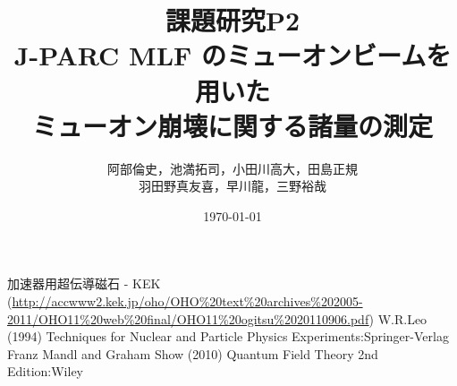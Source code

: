 \documentclass[titlepage]{jsarticle}
\begin{document}
\title{課題研究P2\\J-PARC MLF  のミューオンビームを用いた\\ミューオン崩壊に関する諸量の測定}
\author{阿部倫史，池満拓司，小田川高大，田島正規\\羽田野真友喜，早川龍，三野裕哉}
\date{\today}
\maketitle
\tableofcontents
\newpage
%







\newpage
\appendix

\begin{thebibliography}{99} 
 加速器用超伝導磁石 - KEK (\url{http://accwww2.kek.jp/oho/OHO\%20text\%20archives\%202005-2011/OHO11\%20web\%20final/OHO11\%20ogitsu\%2020110906.pdf}) 
 W.R.Leo (1994) Techniques for Nuclear and Particle Physics Experiments:Springer-Verlag
 Franz Mandl and Graham Show (2010) Quantum Field Theory 2nd Edition:Wiley
\end{thebibliography} 
\end{document}

